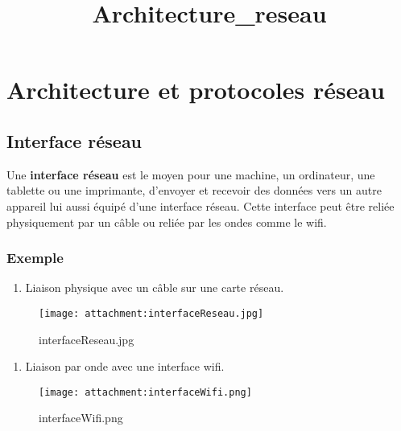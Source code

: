 \documentclass[11pt]{article}
\title{Architecture\_reseau}
\providecommand{\tightlist}{%
      \setlength{\itemsep}{0pt}\setlength{\parskip}{0pt}}
\begin{document}
    
    \maketitle
    
    

    
    \hypertarget{architecture-et-protocoles-ruxe9seau}{%
\section{Architecture et protocoles
réseau}\label{architecture-et-protocoles-ruxe9seau}}

    \hypertarget{interface-ruxe9seau}{%
\subsection{Interface réseau}\label{interface-ruxe9seau}}

Une \textbf{interface réseau} est le moyen pour une machine, un
ordinateur, une tablette ou une imprimante, d'envoyer et recevoir des
données vers un autre appareil lui aussi équipé d'une interface réseau.
Cette interface peut être reliée physiquement par un câble ou reliée par
les ondes comme le wifi.

\hypertarget{exemple}{%
\subsubsection{Exemple}\label{exemple}}

\begin{enumerate}
\def\labelenumi{\arabic{enumi}.}
\tightlist
\item
  Liaison physique avec un câble sur une carte réseau.
\end{enumerate}

    \begin{figure}
\centering
\texttt{[image: attachment:interfaceReseau.jpg]}
\caption{interfaceReseau.jpg}
\end{figure}

    \begin{enumerate}
\def\labelenumi{\arabic{enumi}.}
\setcounter{enumi}{1}
\tightlist
\item
  Liaison par onde avec une interface wifi.
\end{enumerate}

    \begin{figure}
\centering
\texttt{[image: attachment:interfaceWifi.png]}
\caption{interfaceWifi.png}
\end{figure}
\end{document}

